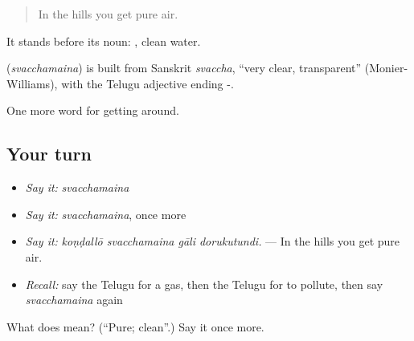 \begin{quote}
In the hills you get pure air.
\end{quote}

It stands before its noun:  , clean water.

\begin{cousinweb}
\textbf{} (\emph{svacchamaina}) is built from Sanskrit \emph{svaccha}, \textquotedblleft{}very clear, transparent\textquotedblright{} (Monier-Williams), with the Telugu adjective ending -.
\end{cousinweb}

\begin{grammarlens}[title={What you've built}]
One more word for getting around.
\end{grammarlens}

\subsection*{Your turn}
\begin{itemize}
\raggedright
  \item \emph{Say it:} \emph{svacchamaina}
  \item \emph{Say it:} \emph{svacchamaina}, once more
  \item \emph{Say it:} \emph{koṇḍallō svacchamaina gāli dorukutundi.} — In the hills you get pure air.
  \item \emph{Recall:} say the Telugu for a gas, then the Telugu for to pollute, then say \emph{svacchamaina} again
\end{itemize}

\begin{tcolorbox}[breakable,colback=teal!4,colframe=teal!35!black,title={Before you move on}]
What does  mean? (\textquotedblleft{}Pure; clean\textquotedblright{}.) Say it once more.
\end{tcolorbox}
